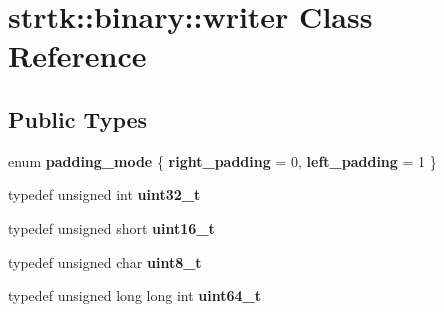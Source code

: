 \hypertarget{classstrtk_1_1binary_1_1writer}{\section{strtk\-:\-:binary\-:\-:writer Class Reference}
\label{classstrtk_1_1binary_1_1writer}
}
\subsection*{Public Types}
\begin{DoxyCompactItemize}
\item 
enum {\bfseries padding\-\_\-mode} \{ {\bfseries right\-\_\-padding} = 0, 
{\bfseries left\-\_\-padding} = 1
 \}
\item 
\hypertarget{classstrtk_1_1binary_1_1writer_affcbbae82347870c84633b33876eab31}{typedef unsigned int {\bfseries uint32\-\_\-t}}\label{classstrtk_1_1binary_1_1writer_affcbbae82347870c84633b33876eab31}

\item 
\hypertarget{classstrtk_1_1binary_1_1writer_aa53599b5c29881695412776541247141}{typedef unsigned short {\bfseries uint16\-\_\-t}}\label{classstrtk_1_1binary_1_1writer_aa53599b5c29881695412776541247141}

\item 
\hypertarget{classstrtk_1_1binary_1_1writer_abda9c0135d40db5a03a40b2c64c32e77}{typedef unsigned char {\bfseries uint8\-\_\-t}}\label{classstrtk_1_1binary_1_1writer_abda9c0135d40db5a03a40b2c64c32e77}

\item 
\hypertarget{classstrtk_1_1binary_1_1writer_a63de13252ee0febc8e5bf808cd9f5d99}{typedef unsigned long long int {\bfseries uint64\-\_\-t}}\label{classstrtk_1_1binary_1_1writer_a63de13252ee0febc8e5bf808cd9f5d99}

\end{DoxyCompactItemize}
